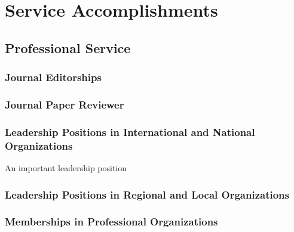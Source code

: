 \section{Service Accomplishments}
\subsection{Professional Service}
\subsubsection{Journal Editorships}

\subsubsection{Journal Paper Reviewer}



\subsubsection{Leadership Positions in International and National Organizations}
\begin{outerenum}
  \item An important leadership position
\end{outerenum}

\subsubsection{Leadership Positions in Regional and Local Organizations}

\subsubsection{Memberships in Professional Organizations}

